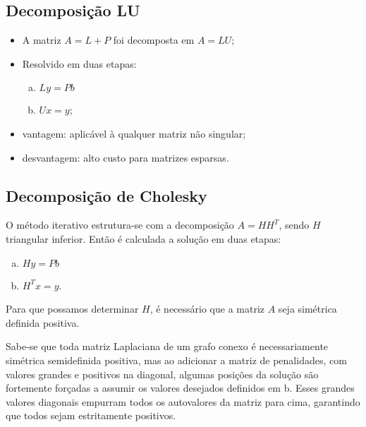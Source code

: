 \documentclass{article} %
\theoremstyle{definition}
\begin{document}
        \subsection*{Decomposição LU}
            \begin{itemize}
                \item A matriz $A = L + P$ foi decomposta em  $A = LU$;
                \item Resolvido em duas etapas:
                    \begin{enumerate}[a)]
                        \item $Ly = Pb$
                        \item  $Ux = y$;
                    \end{enumerate}
                \item vantagem: aplicável à qualquer matriz não singular;
                \item desvantagem: alto custo para matrizes esparsas.
            \end{itemize}
            \subsection*{Decomposição de Cholesky}
            
                O método iterativo estrutura-se com a decomposição $A = HH^T$, sendo $H$ triangular
                inferior.
                Então é calculada a solução em duas etapas:
                \begin{enumerate}[a)]
                    \item $Hy = Pb$
                    \item $H^Tx = y$.
                \end{enumerate}
                Para que possamos determinar $H$, é necessário que a matriz $A$ seja simétrica
                definida positiva.

                Sabe-se que toda matriz Laplaciana de um grafo conexo é necessariamente simétrica 
                semidefinida
                positiva, mas ao adicionar a matriz de penalidades, com valores grandes e positivos 
                na diagonal,
                algumas posições da solução são fortemente forçadas a assumir os valores desejados
                definidos em b.
                Esses grandes valores diagonais empurram todos os autovalores da matriz para cima,
                garantindo
                que todos sejam estritamente positivos.
\end{document}
